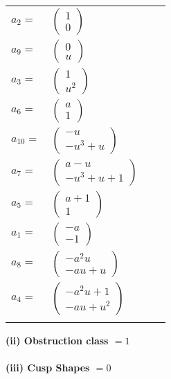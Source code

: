 \documentclass[1p]{elsarticle_modified}
\theoremstyle{definition}
\begin{document}
\begin{tabular}{m{7pt} m{180pt} m{7pt} m{180pt} }
\flushright $a_{2}=$&$\begin{pmatrix}1\\0\end{pmatrix}$ \\
\flushright $a_{9}=$&$\begin{pmatrix}0\\u\end{pmatrix}$ \\
\flushright $a_{3}=$&$\begin{pmatrix}1\\u^2\end{pmatrix}$ \\
\flushright $a_{6}=$&$\begin{pmatrix}a\\1\end{pmatrix}$ \\
\flushright $a_{10}=$&$\begin{pmatrix}- u\\- u^3+u\end{pmatrix}$ \\
\flushright $a_{7}=$&$\begin{pmatrix}a- u\\- u^3+u+1\end{pmatrix}$ \\
\flushright $a_{5}=$&$\begin{pmatrix}a+1\\1\end{pmatrix}$ \\
\flushright $a_{1}=$&$\begin{pmatrix}- a\\-1\end{pmatrix}$ \\
\flushright $a_{8}=$&$\begin{pmatrix}- a^2 u\\- a u+u\end{pmatrix}$ \\
\flushright $a_{4}=$&$\begin{pmatrix}- a^2 u+1\\- a u+u^2\end{pmatrix}$\\&\end{tabular}
\flushleft \textbf{(ii) Obstruction class $= 1$}\\~\\
\flushleft \textbf{(iii) Cusp Shapes $= 0$}\\~\\
\end{document}
